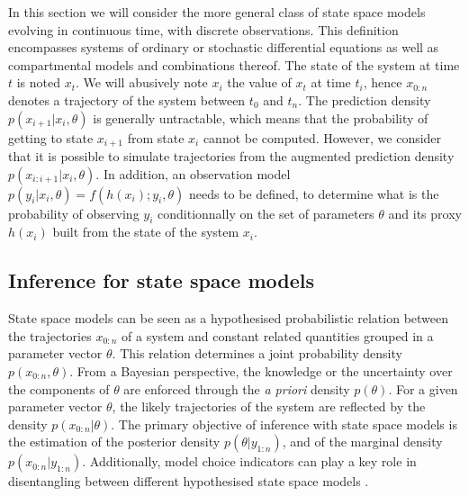 \documentclass[a4paper,11pt,titlepage]{article}
\theoremstyle{plain} %
\begin{document}
In this section we will consider the more general class of state space models evolving in continuous time, with discrete observations. This definition encompasses systems of ordinary or stochastic differential equations as well as compartmental models and combinations thereof. The state of the system at time $t$ is noted $x_t$. We will abusively note $x_i$ the value of $x_t$ at time $t_i$, hence $x_{0:n}$ denotes a trajectory of the system between $t_0$ and $t_n$. The prediction density $p(x_{i+1}|x_i,\theta)$ is generally untractable, which means that the probability of getting to state $x_{i+1}$ from state $x_{i}$ cannot be computed. However, we consider that it is possible to simulate trajectories from the augmented prediction density $p(x_{i:i+1}|x_i,\theta)$.
In addition, an observation model $p(y_i|x_i,\theta)=f(h(x_i);y_{i},\theta)$ needs to be defined, to determine what is the probability of observing $y_i$ conditionnally on the set of parameters $\theta$ and its proxy $h(x_i)$ built from the state of the system $x_i$.

\subsection{Inference for state space models}

State space models can be seen as a hypothesised probabilistic relation between the trajectories $x_{0:n}$ of a system and constant related  quantities grouped in a parameter vector $\theta$. This relation determines a joint probability density $p(x_{0:n},\theta)$. From a Bayesian perspective, the knowledge or the uncertainty over the components of $\theta$ are enforced through the \emph{a priori} density $p(\theta)$. For a given parameter vector $\theta$, the likely trajectories of the system are reflected by the density $p(x_{0:n}|\theta)$. The primary objective of inference with state space models is the estimation of the posterior density $p(\theta|y_{1:n})$, and of the marginal density $p(x_{0:n}|y_{1:n})$. Additionally, model choice indicators can play a key role in disentangling between different hypothesised state space models \citep{Spiegelhalter2002}.
\end{document}
